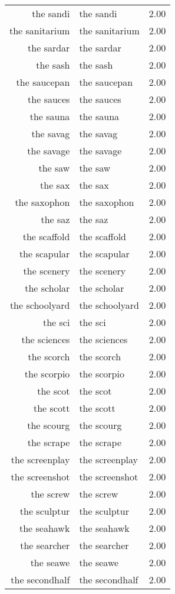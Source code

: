 \begin{table}[ht]
\begin{tabular}{rlr}
  the sandi & the sandi & 2.00 \\ 
  the sanitarium & the sanitarium & 2.00 \\ 
  the sardar & the sardar & 2.00 \\ 
  the sash & the sash & 2.00 \\ 
  the saucepan & the saucepan & 2.00 \\ 
  the sauces & the sauces & 2.00 \\ 
  the sauna & the sauna & 2.00 \\ 
  the savag & the savag & 2.00 \\ 
  the savage & the savage & 2.00 \\ 
  the saw & the saw & 2.00 \\ 
  the sax & the sax & 2.00 \\ 
  the saxophon & the saxophon & 2.00 \\ 
  the saz & the saz & 2.00 \\ 
  the scaffold & the scaffold & 2.00 \\ 
  the scapular & the scapular & 2.00 \\ 
  the scenery & the scenery & 2.00 \\ 
  the scholar & the scholar & 2.00 \\ 
  the schoolyard & the schoolyard & 2.00 \\ 
  the sci & the sci & 2.00 \\ 
  the sciences & the sciences & 2.00 \\ 
  the scorch & the scorch & 2.00 \\ 
  the scorpio & the scorpio & 2.00 \\ 
  the scot & the scot & 2.00 \\ 
  the scott & the scott & 2.00 \\ 
  the scourg & the scourg & 2.00 \\ 
  the scrape & the scrape & 2.00 \\ 
  the screenplay & the screenplay & 2.00 \\ 
  the screenshot & the screenshot & 2.00 \\ 
  the screw & the screw & 2.00 \\ 
  the sculptur & the sculptur & 2.00 \\ 
  the seahawk & the seahawk & 2.00 \\ 
  the searcher & the searcher & 2.00 \\ 
  the seawe & the seawe & 2.00 \\ 
  the secondhalf & the secondhalf & 2.00 \\ 

\end{tabular}
\end{table}
